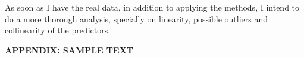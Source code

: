 \documentclass{article}
\begin{document}
	As soon as I have the real data, in addition to applying the methods, I intend to do a more thorough analysis, specially on linearity, possible outliers and collinearity of the predictors.
	
	\pagebreak
	\centering
	\vspace*{\fill}
	\huge \textbf{APPENDIX: SAMPLE TEXT}
	\vspace*{\fill}
	
	
\end{document}
